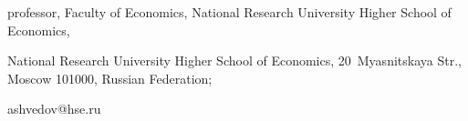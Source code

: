 professor, Faculty of Economics, National Research University Higher School of Economics, 

National Research University Higher School of Economics, 20~Myasnitskaya Str., Moscow 101000, Russian Federation;


\mbox{ashvedov@hse.ru}

 







\label{end\stat}



\renewcommand{\bibname}{\protect\rm Литература}    

